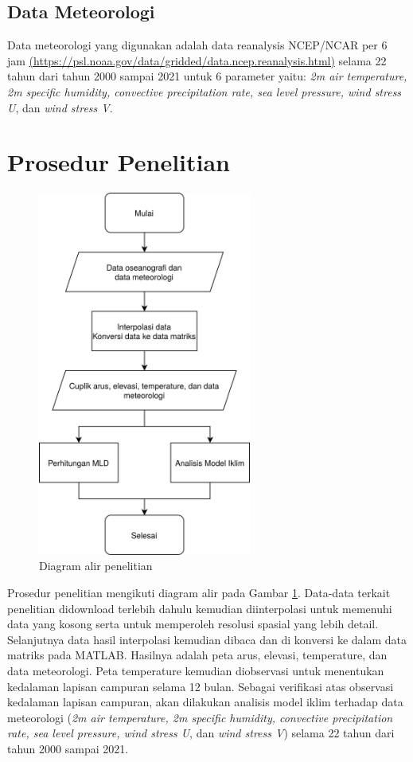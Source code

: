 \begin{spacing}{1.5}
\subsection[Data Meteorologi]{Data Meteorologi}
	Data meteorologi yang digunakan adalah data reanalysis NCEP/NCAR per 6 jam \href{https://psl.noaa.gov/data/gridded/data.ncep.reanalysis.html}{(https://psl.noaa.gov/data/gridded/data.ncep.reanalysis.html)} selama 22 tahun dari tahun 2000 sampai 2021 untuk 6 parameter yaitu: \textit{2m air temperature, 2m specific humidity, convective precipitation rate, sea level pressure, wind stress U}, dan \textit{wind stress V}.
\end{spacing}
\vspace{-0.5pc}
\section[Prosedur Penelitian]{Prosedur Penelitian}
\begin{spacing}{1.5}
	\begin{figure}[H]
		\centering
		\includegraphics[width=7cm]{contents/flowchart.png}
		\caption{Diagram alir penelitian}
		\label{fig:flowchart}
	\end{figure}
	Prosedur penelitian mengikuti diagram alir pada Gambar \ref{fig:flowchart}. Data-data terkait penelitian didownload terlebih dahulu kemudian diinterpolasi untuk memenuhi data yang kosong serta untuk memperoleh resolusi spasial yang lebih detail. Selanjutnya data hasil interpolasi kemudian dibaca dan di konversi ke dalam data matriks pada MATLAB. Hasilnya adalah peta arus, elevasi, temperature, dan data meteorologi. Peta temperature kemudian diobservasi untuk menentukan kedalaman lapisan campuran selama 12 bulan. Sebagai verifikasi atas observasi kedalaman lapisan campuran, akan dilakukan analisis model iklim terhadap data meteorologi (\textit{2m air temperature, 2m specific humidity, convective precipitation rate, sea level pressure, wind stress U}, dan \textit{wind stress V}) selama 22 tahun dari tahun 2000 sampai 2021.
\end{spacing}
\vspace{-0.5pc}
